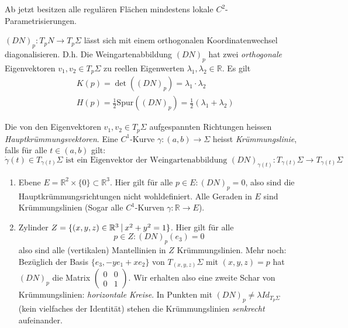 \documentclass[../main.tex]{subfiles}
\begin{document}
\begin{assumption}
Ab jetzt besitzen alle regulären Flächen mindestens lokale \emph{$C^{2}$}-Parametrisierungen.
\end{assumption}
\begin{corollary}
    $(DN)_{p}:T_{p}N \rightarrow T_{p}\Sigma$ lässt sich mit einem orthogonalen Koordinatenwechsel diagonalisieren. 
    D.h. Die Weingartenabbildung $(DN)_{p}$ hat zwei \emph{orthogonale} Eigenvektoren $v_{1},v_{2} \in T_{p}\Sigma$ zu reellen Eigenwerten $\lambda_{1}, \lambda_{2} \in \mathbb{R} $.
    Es gilt \begin{align*}
        &K(p) = \det((DN)_{p}) = \lambda_{1} \cdot \lambda_{2}\\
        &H(p) = \frac{1}{2}\text{Spur}((DN)_{p}) = \frac{1}{2}(\lambda_{1} + \lambda_{2})
    \end{align*}
\end{corollary}
\begin{definition}
    Die von den Eigenvektoren $v_{1}, v_{2} \in T_{p}\Sigma $ aufgespannten Richtungen heissen \emph{Hauptkrümmungsvektoren}. 
    Eine $C^{1}$-Kurve $\gamma:(a,b) \rightarrow \Sigma $ heisst \emph{Krümmungslinie}, falls 
    für alle $t \in (a,b)$ gilt:
    $$\dot{\gamma}(t)\in T_{\gamma(t)}\Sigma \text{ ist ein Eigenvektor der Weingartenabbildung } (DN)_{\gamma(t)}:T_{\gamma(t)}\Sigma \to T_{\gamma(t)}\Sigma $$
\end{definition}
\begin{examples}
    \leavevmode
    \begin{enumerate}
        \item Ebene $E = \mathbb{R}^{2} \times \{0\} \subset \mathbb{R}^{3}$.
        Hier gilt für alle $p \in E: (DN)_{p} = 0$, also sind die Hauptkrümmungsrichtungen nicht wohldefiniert.
        Alle Geraden in $E$ sind Krümmungslinien
        (Sogar alle $C^{1}$-Kurven $\gamma:\mathbb{R}\rightarrow E$).

        \item Zylinder $Z = \{(x,y,z)\in \mathbb{R}^{3} \ \vline \  x^{2} + y^{2} = 1 \}$.
        Hier gilt für alle $$p \in Z: (DN)_{p}(e_{3}) = 0$$ also sind alle (vertikalen) Mantellinien in $Z$ Krümmungslinien.
        Mehr noch: Bezüglich der Basis $\{e_{3}, -y e_{1} + x e_{2}\}$ von $T_{(x,y,z)}\Sigma$ mit $(x,y,z)=p$ hat $(DN)_{p}$ die \linebreak Matrix $\left(\begin{smallmatrix} 0 & 0 \\ 0 & 1 \end{smallmatrix} \right)$.
        Wir erhalten also eine zweite Schar von Krümmungslinien: \emph{horizontale Kreise}.
        In Punkten mit $(DN)_{p} \neq \lambda Id_{T_{p}\Sigma}$ (kein vielfaches der Identität) stehen die Krümmungslinien \emph{senkrecht} aufeinander.
    \end{enumerate}
\end{examples}
\end{document}
